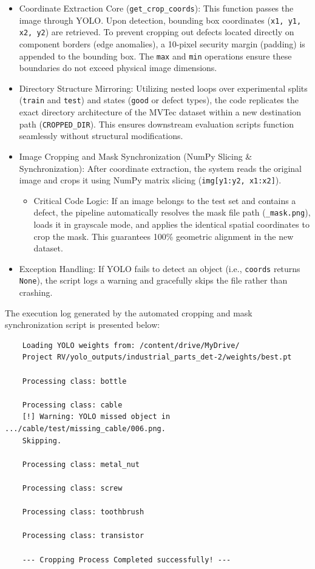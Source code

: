 \documentclass{article}
\begin{document}
\begin{itemize}
	\item Coordinate Extraction Core (\texttt{get\_crop\_coords}): This function passes the image through YOLO. Upon detection, bounding box coordinates (\texttt{x1, y1, x2, y2}) are retrieved. To prevent cropping out defects located directly on component borders (edge anomalies), a 10-pixel security margin (padding) is appended to the bounding box. The \texttt{max} and \texttt{min} operations ensure these boundaries do not exceed physical image dimensions.
	
	\item Directory Structure Mirroring: Utilizing nested loops over experimental splits (\texttt{train} and \texttt{test}) and states (\texttt{good} or defect types), the code replicates the exact directory architecture of the MVTec dataset within a new destination path (\texttt{CROPPED\_DIR}). This ensures downstream evaluation scripts function seamlessly without structural modifications.
	
	\item Image Cropping and Mask Synchronization (NumPy Slicing \& Synchronization): After coordinate extraction, the system reads the original image and crops it using NumPy matrix slicing (\texttt{img[y1:y2, x1:x2]}).
	\begin{itemize}
		\item Critical Code Logic: If an image belongs to the test set and contains a defect, the pipeline automatically resolves the mask file path (\texttt{\_mask.png}), loads it in grayscale mode, and applies the identical spatial coordinates to crop the mask. This guarantees 100\% geometric alignment in the new dataset.
	\end{itemize}
	
	\item Exception Handling: If YOLO fails to detect an object (i.e., \texttt{coords} returns \texttt{None}), the script logs a warning and gracefully skips the file rather than crashing.
\end{itemize}

The execution log generated by the automated cropping and mask synchronization script is presented below:

\begin{tcolorbox}[colback=Tan!15, colframe=MidnightBlue, title=Execution Log for Mask Synchronization Pipeline]
	\begin{verbatim}
	Loading YOLO weights from: /content/drive/MyDrive/
	Project RV/yolo_outputs/industrial_parts_det-2/weights/best.pt		
	
	Processing class: bottle
	
	Processing class: cable
	[!] Warning: YOLO missed object in .../cable/test/missing_cable/006.png. 
	Skipping.
	
	Processing class: metal_nut
	
	Processing class: screw
	
	Processing class: toothbrush
	
	Processing class: transistor
	
	--- Cropping Process Completed successfully! ---
	\end{verbatim}
\end{tcolorbox}
\end{document}
